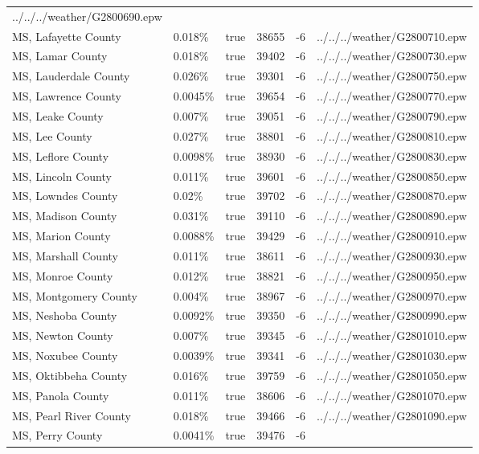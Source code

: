 \begin{longtable}[]{@{}llllll@{}}
../../../weather/G2800690.epw \\
MS, Lafayette County & 0.018\% & true & 38655 & -6 &
../../../weather/G2800710.epw \\
MS, Lamar County & 0.018\% & true & 39402 & -6 &
../../../weather/G2800730.epw \\
MS, Lauderdale County & 0.026\% & true & 39301 & -6 &
../../../weather/G2800750.epw \\
MS, Lawrence County & 0.0045\% & true & 39654 & -6 &
../../../weather/G2800770.epw \\
MS, Leake County & 0.007\% & true & 39051 & -6 &
../../../weather/G2800790.epw \\
MS, Lee County & 0.027\% & true & 38801 & -6 &
../../../weather/G2800810.epw \\
MS, Leflore County & 0.0098\% & true & 38930 & -6 &
../../../weather/G2800830.epw \\
MS, Lincoln County & 0.011\% & true & 39601 & -6 &
../../../weather/G2800850.epw \\
MS, Lowndes County & 0.02\% & true & 39702 & -6 &
../../../weather/G2800870.epw \\
MS, Madison County & 0.031\% & true & 39110 & -6 &
../../../weather/G2800890.epw \\
MS, Marion County & 0.0088\% & true & 39429 & -6 &
../../../weather/G2800910.epw \\
MS, Marshall County & 0.011\% & true & 38611 & -6 &
../../../weather/G2800930.epw \\
MS, Monroe County & 0.012\% & true & 38821 & -6 &
../../../weather/G2800950.epw \\
MS, Montgomery County & 0.004\% & true & 38967 & -6 &
../../../weather/G2800970.epw \\
MS, Neshoba County & 0.0092\% & true & 39350 & -6 &
../../../weather/G2800990.epw \\
MS, Newton County & 0.007\% & true & 39345 & -6 &
../../../weather/G2801010.epw \\
MS, Noxubee County & 0.0039\% & true & 39341 & -6 &
../../../weather/G2801030.epw \\
MS, Oktibbeha County & 0.016\% & true & 39759 & -6 &
../../../weather/G2801050.epw \\
MS, Panola County & 0.011\% & true & 38606 & -6 &
../../../weather/G2801070.epw \\
MS, Pearl River County & 0.018\% & true & 39466 & -6 &
../../../weather/G2801090.epw \\
MS, Perry County & 0.0041\% & true & 39476 & -6 &

\end{longtable}
